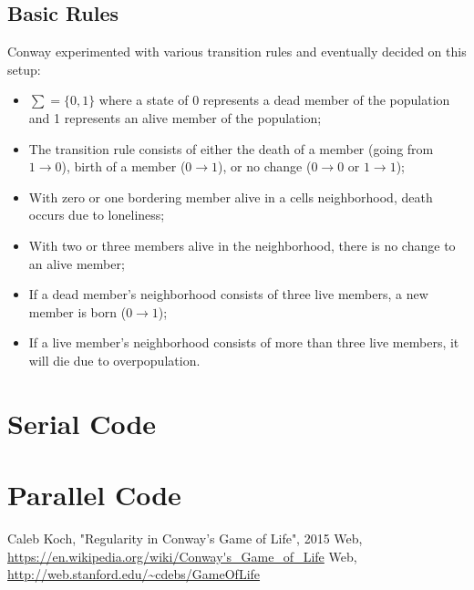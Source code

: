 \documentclass{report}
\begin{document}
\section{Basic Rules}
Conway experimented with various transition rules and eventually decided on this setup:
\begin{itemize}

	\item $\sum = \{0, 1\}$ where a state of 0 represents a dead member of the population    and 1 represents an alive member of the population;
	\item The transition rule consists of either the death of a member (going from $1 \rightarrow 0$), birth of a member ($0 \rightarrow 1$), or no change ($0 \rightarrow 0$ or $1 \rightarrow 1$);
	\item With zero or one bordering member alive in a cells neighborhood, death occurs due to loneliness;
	\item With two or three members alive in the neighborhood, there is no change to an alive member;
	\item If a dead member's neighborhood consists of three live members, a new member is born ($0 \rightarrow 1$);
	\item If a live member's neighborhood consists of more than three live members, it will die due to overpopulation.
\end{itemize}


\appendix

\chapter{Serial Code}



\chapter{Parallel Code}



\begin{thebibliography}{9}
 Caleb Koch, "Regularity in Conway's Game of Life", 2015
 Web, \url{https://en.wikipedia.org/wiki/Conway's_Game_of_Life}
 Web, \url{http://web.stanford.edu/~cdebs/GameOfLife}
\end{thebibliography}
\end{document}
